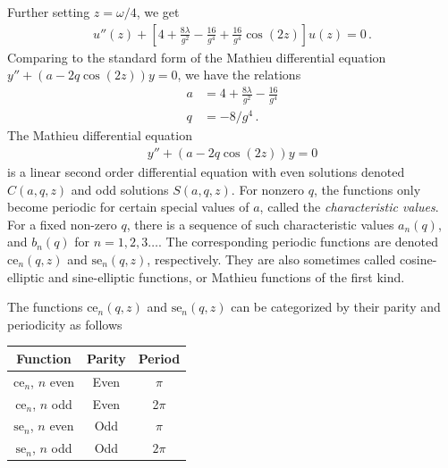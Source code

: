 \documentclass[reprint,superscriptaddress,pra,nofootinbib,preprintnumbers,floatfix]{revtex4-1}
\begin{document}
Further setting $z=\omega/4$, we get
%
\begin{align}
    u''(z) + \left[4 + \frac{8\lambda}{g^2} - \frac{16}{g^4} + \frac{16}{g^4}\cos(2z)\right]u(z)=0
    \,.
\end{align}
%
Comparing to the standard form of the Mathieu differential equation $y''+(a-2q\cos(2z))y=0$, we have the relations
%
\begin{align}
    a&=4 + \frac{8\lambda}{g^2} - \frac{16}{g^4} \nonumber\\
    q&=-8/g^4
    \,.
\end{align}
%
The Mathieu differential equation
%
\begin{align}
    y''+(a-2q\cos(2z))y=0
\end{align}
%
is a linear second order differential equation with even solutions denoted $C(a,q,z)$ and odd solutions $S(a,q,z)$. 
%
For nonzero $q$, the functions only become periodic for certain special values of $a$, called the \textit{characteristic values}. 
%
For a fixed non-zero $q$, there is a sequence of such characteristic values $a_n(q)$, and $b_n(q)$ for $n=1,2,3\hdots$. 
%
The corresponding periodic functions are denoted $\text{ce}_n(q,z)$ and $\text{se}_n(q,z)$, respectively. They are also sometimes called cosine-elliptic and sine-elliptic functions, or Mathieu functions of the first kind.

The functions $\text{ce}_n(q,z)$ and $\text{se}_n(q,z)$ can be categorized by their parity and periodicity as follows
\begin{center}
\begin{tabular}{c|c|c}
    Function \quad & \quad Parity \quad  & \quad Period \\
    \hline
    $\text{ce}_n$, $n$ even & Even & $\pi$ \\
    $\text{ce}_n$, $n$ odd & Even & 2$\pi$ \\
    $\text{se}_n$, $n$ even & Odd & $\pi$ \\
    $\text{se}_n$, $n$ odd & Odd & $2\pi$
\end{tabular}
\end{center}
\end{document}
